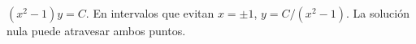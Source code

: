 $(x^2-1)y=C$. En intervalos que evitan $x=\pm1$, $y=C/(x^2-1)$. La solución nula puede atravesar ambos puntos.
